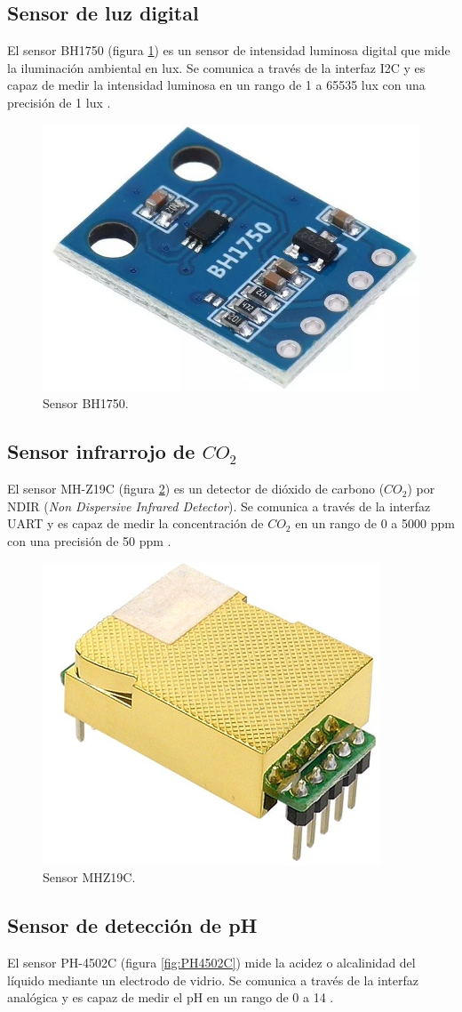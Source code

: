 \subsection{Sensor de luz digital}\label{sec:BH1750}

El sensor BH1750 (figura \ref{fig:BH1750}) es un sensor de intensidad luminosa
digital que mide la iluminación ambiental en lux. Se comunica a través de la
interfaz I2C y es capaz de medir la intensidad luminosa en un rango de 1 a
65535 lux con una precisión de 1 lux \cite{ROHM_BH1750}.

\begin{figure}[H]
	\centering
	\includegraphics[width=.20\textwidth]{./Images/5.png}
	\caption{Sensor BH1750.}
	\label{fig:BH1750}
\end{figure}

\subsection{Sensor infrarrojo de $CO_2$}

El sensor MH-Z19C (figura \ref{fig:MHZ19C}) es un detector de dióxido de
carbono ($CO_2$) por NDIR (\textit{Non Dispersive Infrared Detector}). Se
comunica a través de la interfaz UART y es capaz de medir la concentración de
$CO_2$ en un rango de 0 a 5000 ppm con una precisión de 50 ppm
\cite{WINSEN_MHZ19C}.

\begin{figure}[H]
	\centering
	\includegraphics[width=.15\textwidth]{./Images/6.png}
	\caption{Sensor MHZ19C.}
	\label{fig:MHZ19C}
\end{figure}

\subsection{Sensor de detección de pH}

El sensor PH-4502C (figura \ref{fig:PH4502C}) mide la acidez o alcalinidad del
líquido mediante un electrodo de vidrio. Se comunica a través de la interfaz
analógica y es capaz de medir el pH en un rango de 0 a 14 \cite{PH-4502C}.

